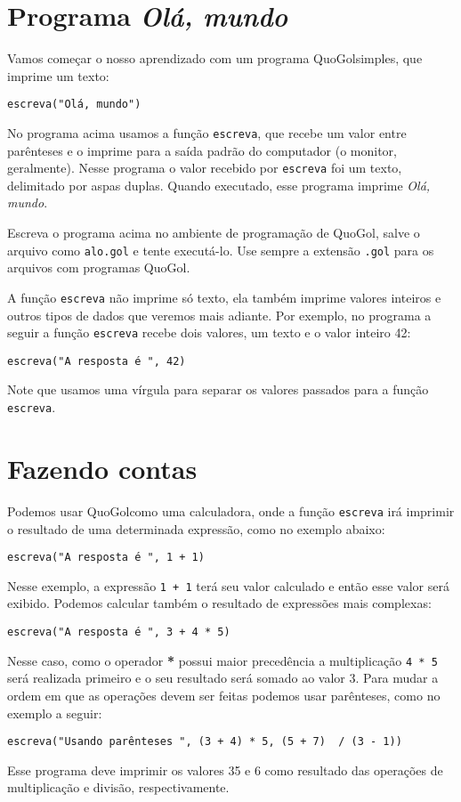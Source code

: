 \documentclass{report}
\newcommand{\Qgol}{QuoGol\;}
\begin{document}
\section{Programa \emph{Olá, mundo}}

Vamos começar o nosso aprendizado com um programa \Qgol simples,
que imprime um texto:
%
\begin{verbatim}
escreva("Olá, mundo")
\end{verbatim}
%
No programa acima usamos a função \texttt{escreva},
que recebe um valor entre parênteses e o imprime para
a saída padrão do computador (o monitor, geralmente).
Nesse programa o valor recebido por \texttt{escreva}
foi um texto, delimitado por aspas duplas. Quando executado,
esse programa imprime \emph{Olá, mundo}.  

Escreva o programa acima no ambiente de programação de \Qgol,
salve o arquivo como \texttt{alo.gol} e tente executá-lo.
Use sempre a extensão \texttt{.gol} para os arquivos com
programas \Qgol.

A função \texttt{escreva} não imprime só texto, ela também
imprime valores inteiros e outros tipos de dados que veremos
mais adiante. Por exemplo, no programa a seguir a função
\texttt{escreva} recebe dois valores, um texto e o valor
inteiro 42:
%
\begin{verbatim}
escreva("A resposta é ", 42)
\end{verbatim}
%
Note que usamos uma vírgula para separar os
valores passados para a função \texttt{escreva}.


\section{Fazendo contas}

Podemos usar \Qgol como uma calculadora, onde a função
\texttt{escreva} irá imprimir o resultado de uma determinada
expressão, como no exemplo abaixo:
%
\begin{verbatim}
escreva("A resposta é ", 1 + 1)
\end{verbatim}
%
Nesse exemplo, a expressão \texttt{1 + 1} terá seu valor
calculado e então esse valor será exibido. Podemos calcular
também o resultado de expressões mais complexas:
\begin{verbatim}
escreva("A resposta é ", 3 + 4 * 5)
\end{verbatim}
% 
Nesse caso, como o operador \textbf{*} possui maior precedência
a multiplicação \texttt{4 * 5} será realizada primeiro e o seu
resultado será somado ao valor 3.
%
Para mudar a ordem em que as operações devem ser feitas podemos
usar parênteses, como no exemplo a seguir:
\begin{verbatim}
escreva("Usando parênteses ", (3 + 4) * 5, (5 + 7)  / (3 - 1))
\end{verbatim}
%
Esse programa deve imprimir os valores 35 e 6 como resultado
das operações de multiplicação e divisão, respectivamente.
\end{document}
